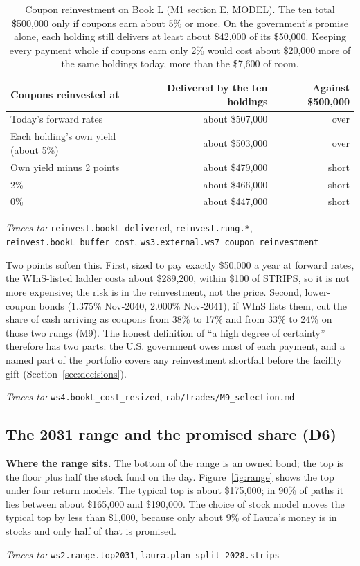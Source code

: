 \documentclass[11pt,a4paper]{article}
\newcommand{\nk}[1]{{\urlstyle{tt}\nolinkurl{#1}}}
\newcommand{\src}[1]{{\urlstyle{tt}\nolinkurl{#1}}}
\newcommand{\keys}[1]{\par{\footnotesize\raggedright\color{black!60}\textit{Traces to:} #1\par}}
\begin{document}
\begin{table}[h]
\centering\small
\begin{tabular}{lrr}
\toprule
Coupons reinvested at & Delivered by the ten holdings & Against \$500,000 \\
\midrule
Today's forward rates & about \$507,000 & over \\
Each holding's own yield (about 5\%) & about \$503,000 & over \\
Own yield minus 2 points & about \$479,000 & short \\
2\% & about \$466,000 & short \\
0\% & about \$447,000 & short \\
\bottomrule
\end{tabular}
\caption{Coupon reinvestment on Book L (M1 section E, MODEL). The ten total \$500,000 only if coupons earn about 5\%
or more. On the government's promise alone, each holding still delivers at least about \$42,000 of its \$50,000.
Keeping every payment whole if coupons earn only 2\% would cost about \$20,000 more of the same holdings today, more
than the \$7,600 of room.}
\label{tab:reinvest}
\end{table}
\keys{\nk{reinvest.bookL_delivered}, \nk{reinvest.rung.*}, \nk{reinvest.bookL_buffer_cost},
\nk{ws3.external.ws7_coupon_reinvestment}}

Two points soften this. First, sized to pay exactly \$50,000 a year at forward rates, the WInS-listed ladder costs
about \$289,200, within \$100 of STRIPS, so it is not more expensive; the risk is in the reinvestment, not the price.
Second, lower-coupon bonds (1.375\% Nov-2040, 2.000\% Nov-2041), if WInS lists them, cut the share of cash arriving as
coupons from 38\% to 17\% and from 33\% to 24\% on those two rungs (M9). The honest definition of ``a high degree of
certainty'' therefore has two parts: the U.S. government owes most of each payment, and a named part of the portfolio
covers any reinvestment shortfall before the facility gift (Section~\ref{sec:decisions}).
\keys{\nk{ws4.bookL_cost_resized}, \src{rab/trades/M9_selection.md}}

\subsection{The 2031 range and the promised share (D6)}\label{sec:range}

\textbf{Where the range sits.} The bottom of the range is an owned bond; the top is the floor plus half the stock
fund on the day. Figure~\ref{fig:range} shows the top under four return models. The typical top is about \$175,000;
in 90\% of paths it lies between about \$165,000 and \$190,000. The choice of stock model moves the typical top by
less than \$1,000, because only about 9\% of Laura's money is in stocks and only half of that is promised.
\keys{\nk{ws2.range.top2031}, \nk{laura.plan_split_2028.strips}}
\end{document}
